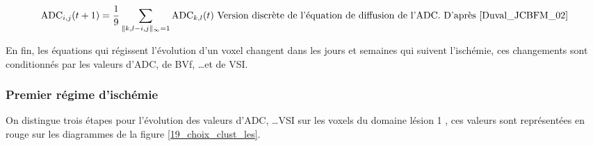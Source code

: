 \begin{equation}
\text{ADC}_{i,j}(t+1)=\frac{1}{9}\sum\limits_{\|k,l-i,j\|_{\infty}=1}\text{ADC}_{k,l}(t)%
\text{ Version discr\g{e}te de l'\'equation de diffusion de l'ADC. D'apr\g{e}s \cite{Duval_JCBFM_02}}
\end{equation}


\par
En fin, les \'equations qui r\'egissent l'\'evolution d'un voxel changent dans les jours et semaines qui suivent l'isch\'emie, %
ces changements sont conditionn\'es par les valeurs d'ADC, de BVf, \dots et de VSI.

\subsubsection{Premier r\'egime d'isch\'emie}

On distingue trois \'etapes pour l'\'evolution des valeurs d'ADC, \dots VSI sur les voxels du domaine \og{} l\'esion 1 \fg{}, %
ces valeurs sont repr\'esent\'ees en rouge sur les diagrammes de la figure \ref{19_choix_clust_les}.

